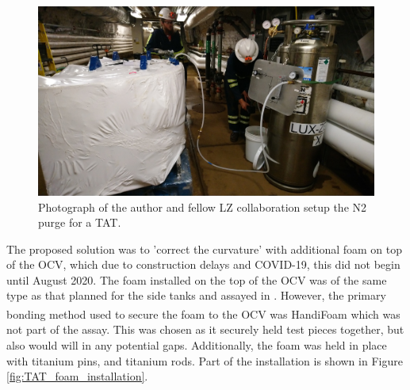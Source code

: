 \begin{figure}[!htbp]
\includegraphics[width=\textwidth]{Figures/Construction/TAT_purging.JPG}
\centering
\caption{Photograph of the author and fellow LZ collaboration setup the N2 purge for a TAT.}
\label{fig:TAT_purging}
\end{figure}

\par
The proposed solution was to 'correct the curvature' with additional foam on top of the OCV, which due to construction delays and COVID-19, this did not begin until August 2020.
The foam installed on the top of the OCV was of the same type as that planned for the side tanks and assayed in \cite{LZ_assay_ref}.
However, the primary bonding method used to secure the foam to the OCV was HandiFoam\textsuperscript{\textregistered} \cite{handifoam_ref} which was not part of the assay.
This was chosen as it securely held test pieces together, but also would will in any potential gaps.
Additionally, the foam was held in place with titanium pins, and titanium rods.
Part of the installation is shown in Figure \ref{fig:TAT_foam_installation}.

